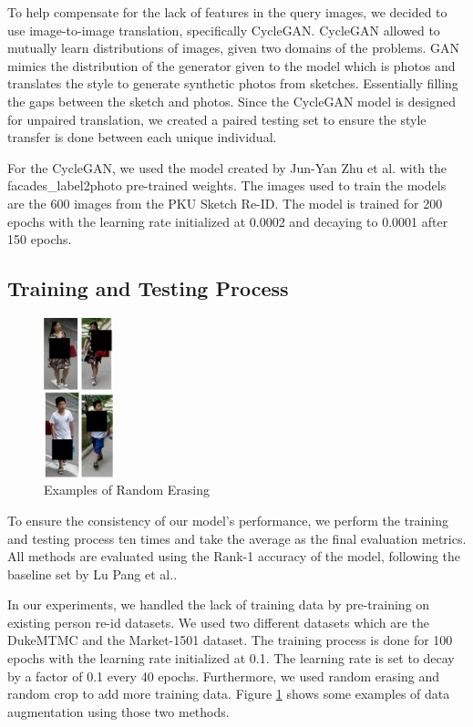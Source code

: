 \documentclass[conference]{IEEEtran}
\begin{document}
	To help compensate for the lack of features in the query images, we decided to use image-to-image translation, specifically CycleGAN. CycleGAN allowed to mutually learn distributions of images, given two domains of the problems. GAN mimics the distribution of the generator given to the model which is photos and translates the style to generate synthetic photos from sketches. Essentially filling the gaps between the sketch and photos. Since the CycleGAN model is designed for unpaired translation, we created a paired testing set to ensure the style transfer is done between each unique individual. 
	
	For the CycleGAN, we used the model created by Jun-Yan Zhu et al. with the facades\_label2photo pre-trained weights. The images used to train the models are the 600 images from the PKU Sketch Re-ID. The model is trained for 200 epochs with the learning rate initialized at 0.0002 and decaying to 0.0001 after 150 epochs.
	
	\vspace{1ex}

	\subsection{Training and Testing Process}
	\vspace{1ex}
	
	\begin{figure}[h!] \centering
		\includegraphics[width=0.18\textwidth]{img/RandomErasing.png}
		\caption{Examples of Random Erasing}
		\label{fig:4}
	\end{figure}
	
	To ensure the consistency of our model's performance, we perform the training and testing process ten times and take the average as the final evaluation metrics. All methods are evaluated using the Rank-1 accuracy of the model, following the baseline set by Lu Pang et al..
	
	In our experiments, we handled the lack of training data by pre-training on existing person re-id datasets. We used two different datasets which are the DukeMTMC and the Market-1501 dataset. The training process is done for 100 epochs with the learning rate initialized at 0.1. The learning rate is set to decay by a factor of 0.1 every 40 epochs. Furthermore, we used random erasing and random crop to add more training data. Figure \ref{fig:4} shows some examples of data augmentation using those two methods.
	
\end{document}
